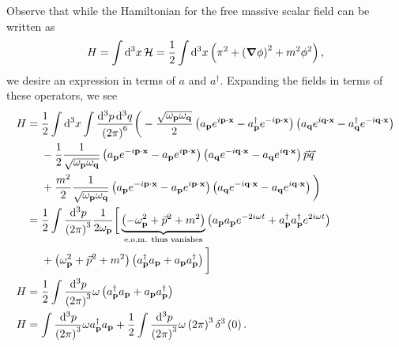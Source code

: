 
Observe that while the Hamiltonian for the free massive scalar field can be written as
\begin{align}
    H = \int \dd{^3x} \mathcal{H} = \frac{1}{2} \int \dd{^3x} \left( \pi^2 + \left( \grad \phi \right)^2 + m^2 \phi^2 \right) 
,\end{align}
we desire an expression in terms of $a$ and $a^{\dag}$. Expanding the fields in terms of these operators, we see
\begin{align}
    H &= \frac{1}{2} \int \dd{^3x} \int \frac{\dd{^3p} \dd{^3q}}{\left( 2\pi \right)^{6}}  \bigg(-\frac{\sqrt{\omega_{\vb{p}} \omega_{\vb{q}}} }{2} \left( a_{\vb{p}} e^{i\vb{p}\cdot \vb{x}} - a^{\dag}_{\vb{p}} e^{-i \vb{p} \cdot \vb{x}} \right) \left( a_{\vb{q}} e^{i\vb{q}\cdot \vb{x}} - a^{\dag}_{\vb{q}} e^{-i \vb{q} \cdot \vb{x}} \right) \nonumber \\
    &\quad ~ -\frac{1}{2} \frac{1}{\sqrt{\omega_{\vb{p}} \omega_{\vb{q}}} } \left( a_{\vb{p}} e^{-i \vb{p} \cdot \vb{x}} - a_{\vb{p}}e^{i \vb{p} \cdot \vb{x}} \right)\left( a_{\vb{q}} e^{-i \vb{q} \cdot \vb{x}} - a_{\vb{q}}e^{i \vb{q} \cdot \vb{x}} \right) \vec{p} \vec{q} \nonumber\\
    & \quad~+ \frac{m^2}{2} \frac{1}{\sqrt{\omega_{\vb{p}} \omega_{\vb{q}}} } \left( a_{\vb{p}} e^{-i \vb{p} \cdot \vb{x}} - a_{\vb{p}}e^{i \vb{p} \cdot \vb{x}} \right)\left( a_{\vb{q}} e^{-i \vb{q} \cdot \vb{x}} - a_{\vb{q}}e^{i \vb{q} \cdot \vb{x}} \right) \bigg)\\
    &= \frac{1}{2} \int \frac{\dd{^3p}}{\left( 2\pi \right)^3} \frac{1}{2 \omega_{\vb{p}}} \bigg[ \underbrace{\left( - \omega_{\vb{p}}^2 +  \vec{p}^2 + m^2 \right)}_{\text{e.o.m. thus vanishes}} \left( a_{\vb{p}} a_{\vb{p}} e^{-2i \omega t} + a_{\vb{p}}^{\dag} a_{\vb{p}}^{\dag} e^{2i \omega t} \right)\\
        &\quad ~ + \left( \omega_{\vb{p}}^2 + \vec{p}^2 + m^2 \right) \left( a_{\vb{p}}^{\dag} a_{\vb{p}} + a_{\vb{p}} a_{\vb{p}}^{\dag} \right)  \bigg]  \\
        H &= \frac{1}{2} \int \frac{\dd{^3p}}{\left( 2\pi \right)^3} \omega \left( a^{\dag}_{\vb{p}} a_{\vb{p}} + a_{\vb{p}} a^{\dag}_{\vb{p}} \right)  \\
        H &=  \int \frac{\dd{^3p}}{\left( 2\pi \right)^3} \omega a^{\dag}_{\vb{p}} a_{\vb{p}} + \frac{1}{2}\int \frac{\dd{^3p}}{\left( 2\pi \right)^3} \omega \left( 2\pi \right)^3 \delta^{3}\left( 0 \right)  
.\end{align}


